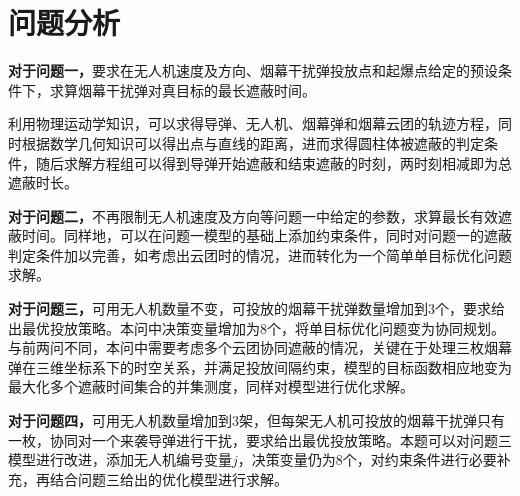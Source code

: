 \documentclass[withoutpreface,bwprint]{cumcmthesis}
\numberwithin{equation}{section} %
\numberwithin{figure}{section} %
\numberwithin{table}{section}  %
\begin{document}
\section{问题分析}
\vspace{-0.5em}
\textbf{对于问题一，}要求在无人机速度及方向、烟幕干扰弹投放点和起爆点给定的预设条件下，求算烟幕干扰弹对真目标的最长遮蔽时间。

利用物理运动学知识，可以求得导弹、无人机、烟幕弹和烟幕云团的轨迹方程，同时根据数学几何知识可以得出点与直线的距离，进而求得圆柱体被遮蔽的判定条件，随后求解方程组可以得到导弹开始遮蔽和结束遮蔽的时刻，两时刻相减即为总遮蔽时长。


\textbf{对于问题二，}不再限制无人机速度及方向等问题一中给定的参数，求算最长有效遮蔽时间。同样地，可以在问题一模型的基础上添加约束条件，同时对问题一的遮蔽判定条件加以完善，如考虑出云团时的情况，进而转化为一个简单单目标优化问题求解。

\textbf{对于问题三，}可用无人机数量不变，可投放的烟幕干扰弹数量增加到3个，要求给出最优投放策略。本问中决策变量增加为8个，将单目标优化问题变为协同规划。与前两问不同，本问中需要考虑多个云团协同遮蔽的情况，关键在于处理三枚烟幕弹在三维坐标系下的时空关系，并满足投放间隔约束，模型的目标函数相应地变为最大化多个遮蔽时间集合的并集测度，同样对模型进行优化求解。


\textbf{对于问题四，}可用无人机数量增加到3架，但每架无人机可投放的烟幕干扰弹只有一枚，协同对一个来袭导弹进行干扰，要求给出最优投放策略。本题可以对问题三模型进行改进，添加无人机编号变量$j$，决策变量仍为8个，对约束条件进行必要补充，再结合问题三给出的优化模型进行求解。
\end{document}
